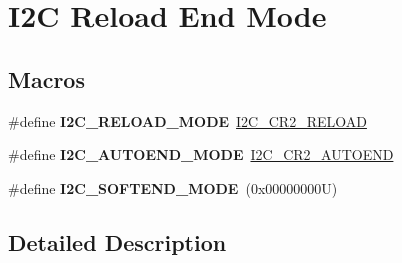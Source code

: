\hypertarget{group___i2_c___r_e_l_o_a_d___e_n_d___m_o_d_e}{}\section{I2C Reload End Mode}
\label{group___i2_c___r_e_l_o_a_d___e_n_d___m_o_d_e}
\subsection*{Macros}
\begin{DoxyCompactItemize}
\item 
\mbox{\label{group___i2_c___r_e_l_o_a_d___e_n_d___m_o_d_e_ga3d83e7d82dfb916acd8773dd455db4ed}} 
\#define {\bfseries I2\+C\+\_\+\+R\+E\+L\+O\+A\+D\+\_\+\+M\+O\+DE}~\mbox{\hyperlink{group___peripheral___registers___bits___definition_ga21a796045451013c964ef8b12ca6c9bb}{I2\+C\+\_\+\+C\+R2\+\_\+\+R\+E\+L\+O\+AD}}
\item 
\mbox{\label{group___i2_c___r_e_l_o_a_d___e_n_d___m_o_d_e_ga7608350f015782c2066afc98e8e00dc3}} 
\#define {\bfseries I2\+C\+\_\+\+A\+U\+T\+O\+E\+N\+D\+\_\+\+M\+O\+DE}~\mbox{\hyperlink{group___peripheral___registers___bits___definition_gabcf789c74e217ec8967bcabc156a6c54}{I2\+C\+\_\+\+C\+R2\+\_\+\+A\+U\+T\+O\+E\+ND}}
\item 
\mbox{\label{group___i2_c___r_e_l_o_a_d___e_n_d___m_o_d_e_ga2af308b39681e4170d02acefcd69d3cf}} 
\#define {\bfseries I2\+C\+\_\+\+S\+O\+F\+T\+E\+N\+D\+\_\+\+M\+O\+DE}~(0x00000000\+U)
\end{DoxyCompactItemize}


\subsection{Detailed Description}
